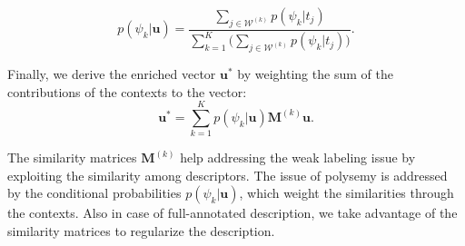 \begin{equation}
p(\psi_k | \mathbf{u}) = \frac{ \sum_{j \in \mathcal{W}^{(k)} } p(\psi_k | t_j) }{\sum_{k =1 }^K \Big( \sum_{j \in \mathcal{W}^{(k)} } p(\psi_k | t_j) \Big)}.
\label{eq:prob_1}
\end{equation}

Finally, we derive the enriched vector $\mathbf{u}^*$ by weighting the sum of the contributions of the contexts to the vector:
\begin{equation}
\mathbf{u}^* = \sum_{k =1}^{K} p(\psi_k | \mathbf{u}) \mathbf{M}^{(k)} \mathbf{u}.
\end{equation}

The similarity matrices $\mathbf{M}^{(k)}$  help addressing the weak labeling issue by exploiting the similarity among descriptors. The issue of polysemy is addressed by the conditional probabilities $p(\psi_k | \mathbf{u})$, which weight the similarities through the contexts. Also in case of full-annotated description, we take advantage of the similarity matrices to regularize the description. 






